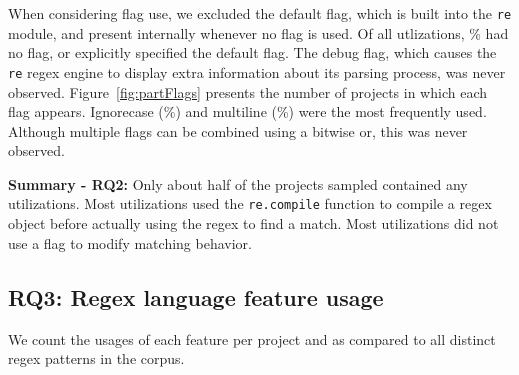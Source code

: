 When considering flag use, we excluded the default flag, which is built into the {\tt re} module, and present internally whenever no flag is used.  Of all utlizations, \% had no flag, or explicitly specified the default flag.  The debug flag, which causes the {\tt re} regex engine to display extra information about its parsing process, was never observed.
 Figure~\ref{fig:partFlags} presents the number of projects in which each flag appears. Ignorecase (\%) and multiline (\%) were the most frequently used.   Although multiple flags can be combined using a bitwise or, this was never observed.

\vspace{6pt}
\textbf{Summary - RQ2:}
Only about half of the projects sampled contained any utilizations.  Most utilizations used the {\tt re.compile} function to compile a regex object before actually using the regex to find a match.  Most utilizations did not use a flag to modify matching behavior.





\subsection{RQ3: Regex language feature usage}
\label{results:rq3}

We  count the usages of each feature per project and as compared to all distinct regex patterns in the corpus.




